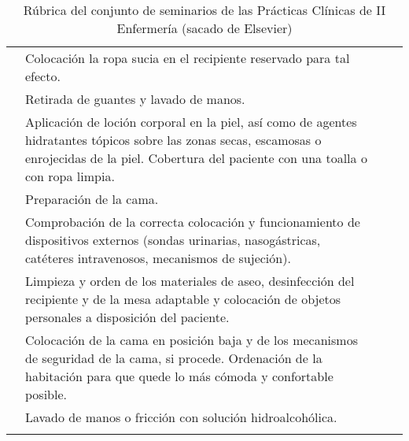 \begin{landscape}
\begin{longtable}{N{0.15\textwidth}M{0.93\textwidth}|M{0.095\textwidth}M{0.22\textwidth}}
        & Colocación la ropa sucia en el recipiente reservado para tal efecto.
        & & \\  
        & Retirada de guantes y lavado de manos.
        & & \\  
        & Aplicación de loción corporal en la piel, así como de agentes hidratantes tópicos sobre las zonas secas, escamosas o enrojecidas de la piel. Cobertura del paciente con una toalla o con ropa limpia.
        & & \\  
        & Preparación de la cama.
        & & \\  
        & Comprobación de la correcta colocación y funcionamiento de dispositivos externos (sondas urinarias, nasogástricas, catéteres intravenosos, mecanismos de sujeción).
        & & \\  
        & Limpieza y orden de los materiales de aseo, desinfección del recipiente y de la mesa adaptable y colocación de objetos personales a disposición del paciente.
        & & \\  
        & Colocación de la cama en posición baja y de los mecanismos de seguridad de la cama, si procede. Ordenación de la habitación para que quede lo más cómoda y confortable posible.
        & & \\  
        & Lavado de manos o fricción con solución hidroalcohólica.
            & & \\ \hline
        \caption{Rúbrica del conjunto de seminarios de las Prácticas Clínicas de II Enfermería (sacado de Elsevier)}
        \label{tab:PlanXVIII:RubricaElsevier}   
    \end{longtable}
\end{landscape}